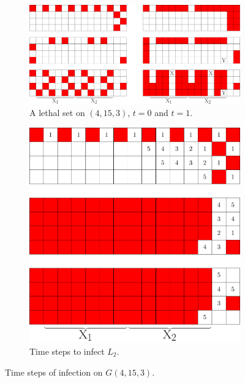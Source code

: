 \begin{figure}[]
\centering
\begin{subfigure}{0.65\textwidth}
\includegraphics[width=\textwidth]{figures/7/4x15x3.pdf}
\caption{A lethal set on $(4,15,3)$, $t=0$ and $t=1$.}
\label{fig:4x15x3}
\end{subfigure} \hfill%
\begin{subfigure}{0.3\textwidth}
\includegraphics[width=\textwidth]{figures/7/4x15x3_timesteps_numbered_heatmap.pdf}
\caption{Time steps to infect $L_2$.}
\label{fig:4x15x3_timesteps}
\end{subfigure}
\caption{Time steps of infection on $G(4,15,3)$.}
\label{fig:}
\end{figure} 

